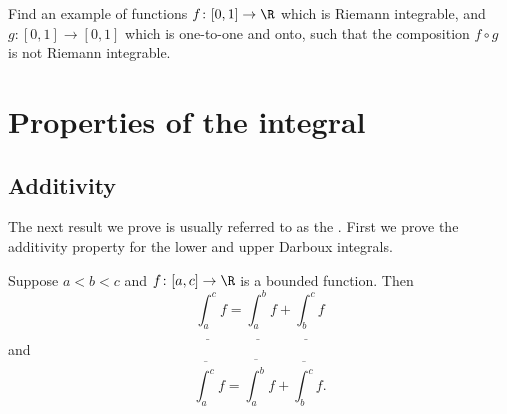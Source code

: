 \documentclass[12pt]{book}
\begin{document}
\begin{exercise}[Challenging]
Find an example of functions
$f \colon [0,1] \to \R$ which is Riemann integrable,
and $g \colon [0,1] \to [0,1]$ which is one-to-one and onto,
such that the composition $f \circ g$ is not Riemann integrable.
\end{exercise}


\sectionnewpage
\section{Properties of the integral}
\label{sec:rintprop}


\subsection*{Additivity}

The next result we prove is usually referred to as the
.
First we prove the additivity
property for the lower and upper Darboux integrals.

\begin{lemma} \label{lemma:darbouxadd}
Suppose $a < b < c$ and $f \colon [a,c] \to \R$ is a bounded function.
Then
\begin{equation*}
\underline{\int_a^c} f
=
\underline{\int_a^b} f
+
\underline{\int_b^c} f
\end{equation*}
and
\begin{equation*}
\overline{\int_a^c} f
=
\overline{\int_a^b} f
+
\overline{\int_b^c} f .
\end{equation*}
\end{lemma}
\end{document}
